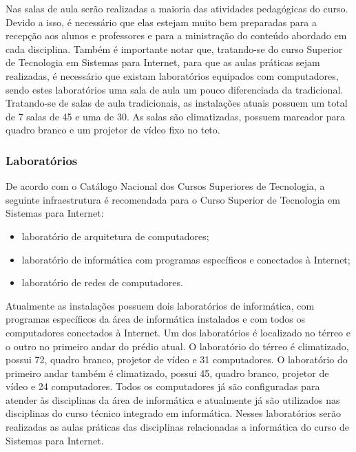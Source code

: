 Nas salas de aula serão realizadas a maioria das atividades pedagógicas do curso. Devido a isso, é necessário que elas estejam muito bem preparadas para a recepção aos alunos e professores e para a ministração do conteúdo abordado em cada disciplina. Também é importante notar que, tratando-se do curso Superior de Tecnologia em Sistemas para Internet, para que as aulas práticas sejam realizadas, é necessário que existam laboratórios equipados com computadores,  sendo estes laboratórios uma sala de aula um pouco diferenciada da tradicional. Tratando-se de salas de aula tradicionais, as instalações atuais possuem um total de 7 salas de \unit{45}{\squaremetre} e uma de \unit{30}{\squaremetre}. As salas são climatizadas, possuem marcador para quadro branco e um projetor de vídeo fixo no teto.

\subsubsection{Laborat\'orios}

	De acordo com o Catálogo Nacional dos Cursos Superiores de Tecnologia, a seguinte infraestrutura é recomendada para o Curso Superior de Tecnologia em Sistemas para Internet:
	
\begin{itemize}
	\item laboratório de arquitetura de computadores;
	\item laboratório de informática com programas específicos e conectados à Internet;
	\item laboratório de redes de computadores.
\end{itemize}

	Atualmente as instalações possuem dois laboratórios de informática, com programas específicos da área de informática instalados e com todos os computadores conectados à Internet. Um dos laboratórios é localizado no térreo e o outro no primeiro andar do prédio atual. O laboratório do térreo é climatizado, possui \unit{72}{\squaremetre}, quadro branco, projetor de vídeo e 31 computadores. O laboratório do primeiro andar também é climatizado, possui \unit{45}{\squaremetre}, quadro branco, projetor de vídeo e 24 computadores. Todos os computadores já são configuradas para atender às disciplinas da área de informática e atualmente já são utilizados nas disciplinas do curso técnico integrado em informática. Nesses laboratórios serão realizadas as aulas práticas das disciplinas relacionadas a informática do curso de Sistemas para Internet.
	
